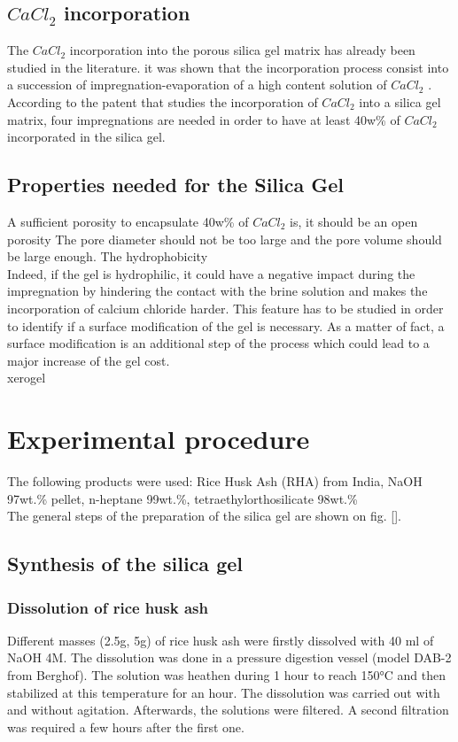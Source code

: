 \documentclass[12pt,a4paper]{article}
\begin{document}
\subsection*{$CaCl_2$ incorporation}
The $CaCl_2$ incorporation into the porous silica gel matrix has already been studied in the literature. it was shown that 
the incorporation process consist into a succession of impregnation-evaporation of a high content solution of $CaCl_2$ \cite{courbon}.
\\According to the patent \cite{brevet} that studies the incorporation of $CaCl_2$ into a silica gel matrix, four impregnations are needed in order to have at least 40w\% of $CaCl_2$ incorporated in the silica gel.

\subsection*{Properties needed for the Silica Gel}
A sufficient porosity to encapsulate 40w\% of $CaCl_2$ is, it should be an open porosity
The pore diameter should not be too large and the pore volume should be large enough.
The hydrophobicity 
\\Indeed, if the gel is hydrophilic, it could have a negative impact during the impregnation by hindering the contact with the brine solution and makes the incorporation of calcium chloride harder. This feature has to be studied in order to identify if a surface modification of the gel is necessary. As a matter of fact, a surface modification is an additional step of the process which could lead to a major increase of the gel cost.
\\xerogel

\section{Experimental procedure}
The following products were used: Rice Husk Ash (RHA) from India, NaOH 97wt.\% pellet, n-heptane 99wt.\%, tetraethylorthosilicate 98wt.\%\\
The general steps of the preparation of the silica gel are shown on fig. []. %
\subsection{Synthesis of the silica gel}
\subsubsection*{Dissolution of rice husk ash}
Different masses (2.5g, 5g) of rice husk ash were firstly dissolved with 40 ml of NaOH 4M. The dissolution was done in a pressure digestion vessel (model DAB-2 from Berghof). The solution was heathen during 1 hour to reach 150°C and then stabilized at this temperature for an hour. The dissolution was carried out with and without agitation.
Afterwards, the solutions were filtered. A second filtration was required a few hours after the first one.
\end{document}
